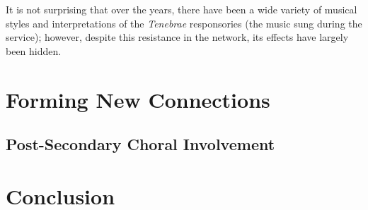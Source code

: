 \documentclass{article} %
\begin{document}
\begin{multicols}{2}
It is not surprising that over the years, there have been a wide variety of musical styles and interpretations of the \textit{Tenebrae} responsories (the music sung during the service); however, despite this resistance in the network, its effects have largely been hidden.


\section{Forming New Connections}

\subsection{Post-Secondary Choral Involvement}



\section{Conclusion}



%
%

\end{multicols}

\label{last_page}
\end{document}
